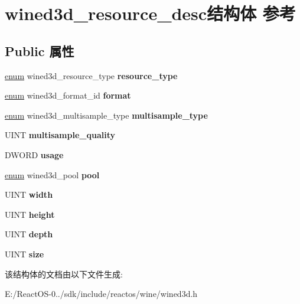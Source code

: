 \hypertarget{structwined3d__resource__desc}{}\section{wined3d\+\_\+resource\+\_\+desc结构体 参考}
\label{structwined3d__resource__desc}
\subsection*{Public 属性}
\begin{DoxyCompactItemize}
\item 
\mbox{\label{structwined3d__resource__desc_a0584242e86f4b1b891f876316f42f1b5}} 
\hyperlink{interfaceenum}{enum} wined3d\+\_\+resource\+\_\+type {\bfseries resource\+\_\+type}
\item 
\mbox{\label{structwined3d__resource__desc_ae1f2945cc50b09bbc75eaa86562dd03e}} 
\hyperlink{interfaceenum}{enum} wined3d\+\_\+format\+\_\+id {\bfseries format}
\item 
\mbox{\label{structwined3d__resource__desc_a4754bd239a16ac0ccaf9ff817ef8ccf8}} 
\hyperlink{interfaceenum}{enum} wined3d\+\_\+multisample\+\_\+type {\bfseries multisample\+\_\+type}
\item 
\mbox{\label{structwined3d__resource__desc_a135465859f765bd79d6b4477c8547682}} 
U\+I\+NT {\bfseries multisample\+\_\+quality}
\item 
\mbox{\label{structwined3d__resource__desc_a834c73265964d26901271ebbab570822}} 
D\+W\+O\+RD {\bfseries usage}
\item 
\mbox{\label{structwined3d__resource__desc_ad601a28c65b328ba19a1a01cc0a3fb2a}} 
\hyperlink{interfaceenum}{enum} wined3d\+\_\+pool {\bfseries pool}
\item 
\mbox{\label{structwined3d__resource__desc_a8dd93c4b0c06bd54dcf5fb9e662c324f}} 
U\+I\+NT {\bfseries width}
\item 
\mbox{\label{structwined3d__resource__desc_a583e80618f14ba4c4ffc3804db89763d}} 
U\+I\+NT {\bfseries height}
\item 
\mbox{\label{structwined3d__resource__desc_adf87cd9d9930208d11630662e8d484de}} 
U\+I\+NT {\bfseries depth}
\item 
\mbox{\label{structwined3d__resource__desc_aad30b7ea1e58abda01dff5f193d25ab4}} 
U\+I\+NT {\bfseries size}
\end{DoxyCompactItemize}


该结构体的文档由以下文件生成\+:\begin{DoxyCompactItemize}
\item 
E\+:/\+React\+O\+S-\/0../sdk/include/reactos/wine/wined3d.\+h\end{DoxyCompactItemize}
